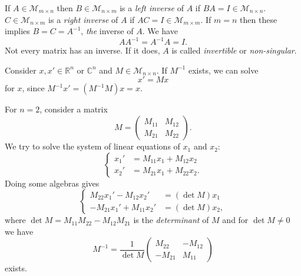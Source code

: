 \documentclass[10pt]{article}
\begin{document}
    \begin{definition}
        If $ A\in \mathcal{M}_{m\times n} $ then $ B\in \mathcal{M}_{n\times m} $ is a \textit{left inverse} of $A$ if $ BA=I\in \mathcal{M}_{n \times n} $. $ C\in \mathcal{M}_{n \times m} $ is a \textit{right inverse} of $A$ if $ AC=I\in \mathcal{M}_{m \times m} $. If $m=n$ then these implies $ B=C=A^{-1} $, \textit{the }inverse of $A$. We have 
        \[
            AA^{-1}=A^{-1}A=I
        .\]
        Not every matrix has an inverse. If it does, $A$ is called \textit{invertible} or \textit{non-singular}.
    \end{definition}
    Consider $ x,x'\in \mathbb{R}^{n} $ or $\mathbb{C}^{n}$ and $ M\in \mathcal{M}_{n \times n} $. If $ M^{-1} $ exists, we can solve 
    \[
        x'=Mx
    \]
    for $x$, since $ M^{-1}x'=(M^{-1}M)x=x $.
    \begin{example}
        For $n=2$, consider a matrix
        \[
            M=\begin{pmatrix}
                M_{11}&M_{12}\\
                M_{21}&M_{22}
            \end{pmatrix}
        .\]
        We try to solve the system of linear equations of $x_1$ and $x_2$:
        \[
            \left\{\begin{aligned}
                 x_{1}'&=M_{11}x_1+M_{12}x_2\\
                 x_2'&=M_{21}x_1+M_{22}x_2.
            \end{aligned}\right.
        \]
        Doing some algebras gives 
        \[
            \left\{\begin{aligned}
                M_{22}x_1'-M_{12}x_2'&=(\det M)x_1\\
                -M_{21}x_1'+M_{11}x_2'&=(\det M)x_2,
           \end{aligned}\right.
        \]
        where $ \det M=M_{11}M_{22}-M_{12}M_{21} $ is the \textit{determinant} of $M$ and for $ \det M\neq 0 $ we have 
        \[
            M^{-1}=\frac{1}{\det M}\begin{pmatrix}
                M_{22}&-M_{12}\\
                -M_{21}&M_{11}
            \end{pmatrix}
        \]
        exists.
    \end{example}
\end{document}
